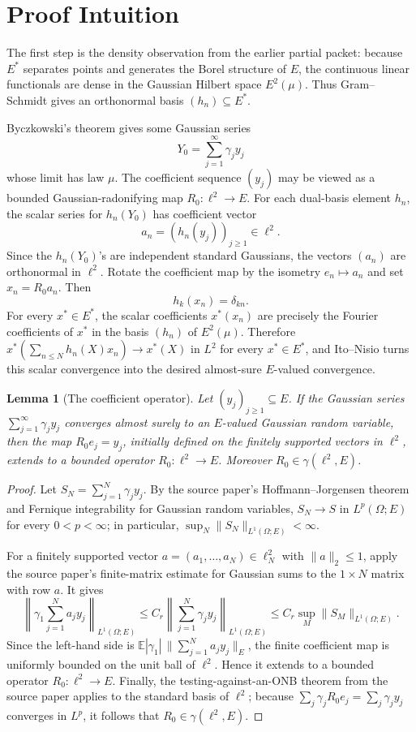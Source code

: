 \documentclass[11pt]{article}
\newtheorem{lemma}{Lemma}
\newcommand{\EE}{\mathbb E}
\begin{document}
\section*{Proof Intuition}

The first step is the density observation from the earlier partial packet:
because \(E^*\) separates points and generates the Borel structure of \(E\),
the continuous linear functionals are dense in the Gaussian Hilbert space
\(E^2(\mu)\). Thus Gram--Schmidt gives an orthonormal basis
\((h_n)\subseteq E^*\).

Byczkowski's theorem gives some Gaussian series
\[
  Y_0=\sum_{j=1}^\infty \gamma_j y_j
\]
whose limit has law \(\mu\). The coefficient sequence \((y_j)\) may be viewed
as a bounded Gaussian-radonifying map \(R_0:\ell^2\to E\). For each dual-basis
element \(h_n\), the scalar series for \(h_n(Y_0)\) has coefficient vector
\[
  a_n=(h_n(y_j))_{j\ge 1}\in \ell^2.
\]
Since the \(h_n(Y_0)\)'s are independent standard Gaussians, the vectors
\((a_n)\) are orthonormal in \(\ell^2\). Rotate the coefficient map by the
isometry \(e_n\mapsto a_n\) and set \(x_n=R_0a_n\). Then
\[
  h_k(x_n)=\delta_{kn}.
\]
For every \(x^*\in E^*\), the scalar coefficients \(x^*(x_n)\) are precisely
the Fourier coefficients of \(x^*\) in the basis \((h_n)\) of \(E^2(\mu)\).
Therefore \(x^*(\sum_{n\le N} h_n(X)x_n)\to x^*(X)\) in \(L^2\) for every
\(x^*\in E^*\), and Ito--Nisio turns this scalar convergence into the desired
almost-sure \(E\)-valued convergence.

\begin{lemma}[The coefficient operator]
Let \((y_j)_{j\ge 1}\subseteq E\). If the Gaussian series
\(\sum_{j=1}^\infty \gamma_j y_j\) converges almost surely to an \(E\)-valued
Gaussian random variable, then the map \(R_0e_j=y_j\), initially defined on
the finitely supported vectors in \(\ell^2\), extends to a bounded operator
\(R_0:\ell^2\to E\). Moreover \(R_0\in\gamma(\ell^2,E)\).
\end{lemma}

\begin{proof}
Let \(S_N=\sum_{j=1}^N\gamma_j y_j\). By the source paper's
Hoffmann--Jorgensen theorem and Fernique integrability for Gaussian random
variables, \(S_N\to S\) in \(L^p(\Omega;E)\) for every \(0<p<\infty\); in
particular, \(\sup_N\|S_N\|_{L^1(\Omega;E)}<\infty\).

For a finitely supported vector \(a=(a_1,\ldots,a_N)\in\ell^2_N\) with
\(\|a\|_2\le 1\), apply the source paper's finite-matrix estimate for Gaussian
sums to the \(1\times N\) matrix with row \(a\). It gives
\[
  \left\|
    \gamma_1\sum_{j=1}^N a_jy_j
  \right\|_{L^1(\Omega;E)}
  \le
  C_r
  \left\|
    \sum_{j=1}^N \gamma_jy_j
  \right\|_{L^1(\Omega;E)}
  \le C_r\sup_M \|S_M\|_{L^1(\Omega;E)} .
\]
Since the left-hand side is
\(\EE|\gamma_1|\,\|\sum_{j=1}^N a_jy_j\|_E\), the finite coefficient map is
uniformly bounded on the unit ball of \(\ell^2\). Hence it extends to a
bounded operator \(R_0:\ell^2\to E\). Finally, the testing-against-an-ONB
theorem from the source paper applies to the standard basis of \(\ell^2\);
because \(\sum_j\gamma_jR_0e_j=\sum_j\gamma_jy_j\) converges in \(L^p\), it
follows that \(R_0\in\gamma(\ell^2,E)\).
\end{proof}
\end{document}

